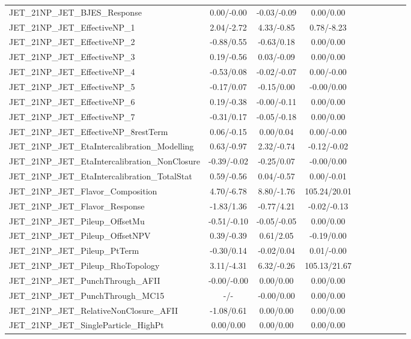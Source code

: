 \begin{table}[h]
\begin{center}
\begin{tabular}{l|ccccccccc}
JET\_21NP\_JET\_BJES\_Response &0.00/-0.00 &-0.03/-0.09 &0.00/0.00 \\
JET\_21NP\_JET\_EffectiveNP\_1 &2.04/-2.72 &4.33/-0.85 &0.78/-8.23 \\
JET\_21NP\_JET\_EffectiveNP\_2 &-0.88/0.55 &-0.63/0.18 &0.00/0.00 \\
JET\_21NP\_JET\_EffectiveNP\_3 &0.19/-0.56 &0.03/-0.09 &0.00/0.00 \\
JET\_21NP\_JET\_EffectiveNP\_4 &-0.53/0.08 &-0.02/-0.07 &0.00/-0.00 \\
JET\_21NP\_JET\_EffectiveNP\_5 &-0.17/0.07 &-0.15/0.00 &-0.00/0.00 \\
JET\_21NP\_JET\_EffectiveNP\_6 &0.19/-0.38 &-0.00/-0.11 &0.00/0.00 \\
JET\_21NP\_JET\_EffectiveNP\_7 &-0.31/0.17 &-0.05/-0.18 &0.00/0.00 \\
JET\_21NP\_JET\_EffectiveNP\_8restTerm &0.06/-0.15 &0.00/0.04 &0.00/-0.00 \\
JET\_21NP\_JET\_EtaIntercalibration\_Modelling &0.63/-0.97 &2.32/-0.74 &-0.12/-0.02 \\
JET\_21NP\_JET\_EtaIntercalibration\_NonClosure &-0.39/-0.02 &-0.25/0.07 &-0.00/0.00 \\
JET\_21NP\_JET\_EtaIntercalibration\_TotalStat &0.59/-0.56 &0.04/-0.57 &0.00/-0.01 \\
JET\_21NP\_JET\_Flavor\_Composition &4.70/-6.78 &8.80/-1.76 &105.24/20.01 \\
JET\_21NP\_JET\_Flavor\_Response &-1.83/1.36 &-0.77/4.21 &-0.02/-0.13 \\
JET\_21NP\_JET\_Pileup\_OffsetMu &-0.51/-0.10 &-0.05/-0.05 &0.00/0.00 \\
JET\_21NP\_JET\_Pileup\_OffsetNPV &0.39/-0.39 &0.61/2.05 &-0.19/0.00 \\
JET\_21NP\_JET\_Pileup\_PtTerm &-0.30/0.14 &-0.02/0.04 &0.01/-0.00 \\
JET\_21NP\_JET\_Pileup\_RhoTopology &3.11/-4.31 &6.32/-0.26 &105.13/21.67 \\
JET\_21NP\_JET\_PunchThrough\_AFII &-0.00/-0.00 &0.00/0.00 &0.00/0.00 \\
JET\_21NP\_JET\_PunchThrough\_MC15 &-/- &-0.00/0.00 &0.00/0.00 \\
JET\_21NP\_JET\_RelativeNonClosure\_AFII &-1.08/0.61 &0.00/0.00 &0.00/0.00 \\
JET\_21NP\_JET\_SingleParticle\_HighPt &0.00/0.00 &0.00/0.00 &0.00/0.00 \\
\hline
\end{tabular}
\end{center}
\end{table}
